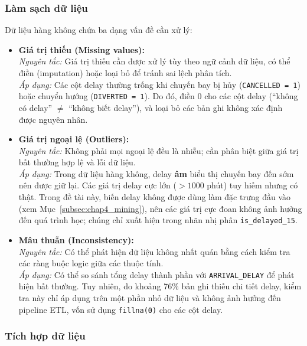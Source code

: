 \subsubsection{Làm sạch dữ liệu}

\noindent Dữ liệu hàng không chứa ba dạng vấn đề cần xử lý:
\begin{itemize}
    \item \textbf{Giá trị thiếu (Missing values):} \\
    \textit{Nguyên tắc:} Giá trị thiếu cần được xử lý tùy theo ngữ cảnh dữ liệu,
    có thể điền (imputation) hoặc loại bỏ để tránh sai lệch phân tích. \\
    \textit{Áp dụng:} Các cột delay thường trống khi chuyến bay bị hủy
    (\texttt{CANCELLED\,=\,1}) hoặc chuyển hướng (\texttt{DIVERTED\,=\,1}).
    Do đó, điền 0 cho các cột delay (``không có delay'' $\neq$ ``không biết delay''),
    và loại bỏ các bản ghi không xác định được nguyên nhân.

    \item \textbf{Giá trị ngoại lệ (Outliers):} \\
    \textit{Nguyên tắc:} Không phải mọi ngoại lệ đều là nhiễu; cần phân biệt
    giữa giá trị bất thường hợp lệ và lỗi dữ liệu. \\
    \textit{Áp dụng:} Trong dữ liệu hàng không, delay \textbf{âm} biểu thị chuyến bay đến sớm
    nên được giữ lại. Các giá trị delay cực lớn ($>1000$ phút) tuy hiếm nhưng có thật.
    Trong đề tài này, biến delay không được dùng làm đặc trưng đầu vào
    (xem Mục~\ref{subsec:chap4_mining}), nên các giá trị cực đoan không ảnh hưởng
    đến quá trình học; chúng chỉ xuất hiện trong nhãn nhị phân
    \texttt{is\_delayed\_15}.

    \item \textbf{Mâu thuẫn (Inconsistency):} \\
    \textit{Nguyên tắc:} Có thể phát hiện dữ liệu không nhất quán bằng cách
    kiểm tra các ràng buộc logic giữa các thuộc tính. \\
    \textit{Áp dụng:} Có thể so sánh tổng delay thành phần với
    \texttt{ARRIVAL\_DELAY} để phát hiện bất thường. Tuy nhiên,
    do khoảng 76\% bản ghi thiếu chi tiết delay, kiểm tra này chỉ áp dụng
    trên một phần nhỏ dữ liệu và không ảnh hưởng đến pipeline ETL,
    vốn sử dụng \texttt{fillna(0)} cho các cột delay.
\end{itemize}

\subsubsection{Tích hợp dữ liệu}

